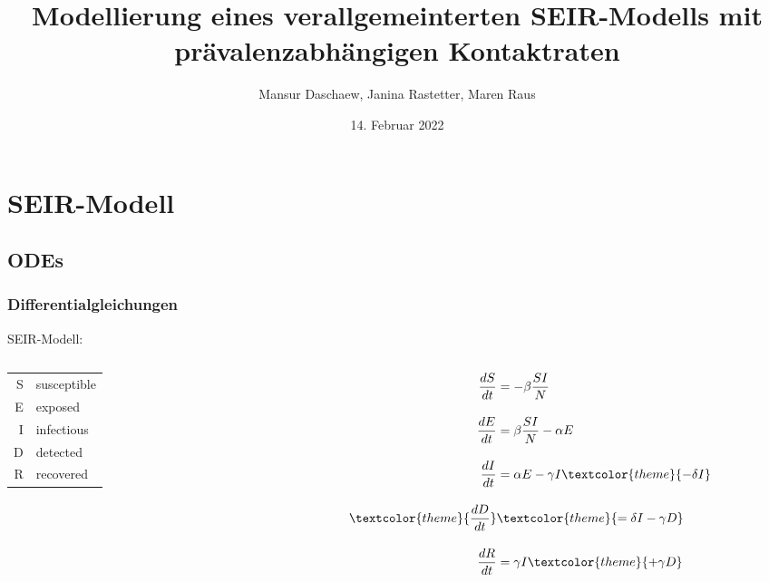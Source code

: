 \documentclass{beamer}
\title[prävalenzabhängige Kontaktraten]{Modellierung eines verallgemeinterten SEIR-Modells mit prävalenzabhängigen Kontaktraten}
\date{14. Februar 2022} %
\author{Mansur Daschaew, Janina Rastetter, Maren Raus}
\begin{document}
\maketitle

\tableofcontents

\section{SEIR-Modell}

\subsection{ODEs}
\begin{frame}
	\frametitle{Differentialgleichungen}
SEIR-Modell:
\begin{columns}
\begin{column}{0.2\textwidth}
	\begin{tabular}{rl}
	S & susceptible \\
	E & exposed \\
	I & infectious \\
	\textcolor{theme}{D} & \textcolor{theme}{detected} \\
	R & recovered \\
	\end{tabular}
\end{column}
\begin{column}{0.2\textwidth} 

		\begin{align*}
		\frac{dS}{dt} &= -\beta \frac{SI}{N} \\[10pt]
		\frac{dE}{dt} &= \beta \frac{SI}{N} - \alpha E \\[10pt]
		\frac{dI}{dt} &= \alpha E - \gamma I \textcolor{theme}{ - \delta I} \\[10pt]
		\textcolor{theme}{\frac{dD}{dt}} &\textcolor{theme}{= \delta I - \gamma D} \\[10pt]
		\frac{dR}{dt} &= \gamma I \textcolor{theme}{+ \gamma D }
		\end{align*}
\end{column}
\end{columns}

\end{frame}
\end{document}
